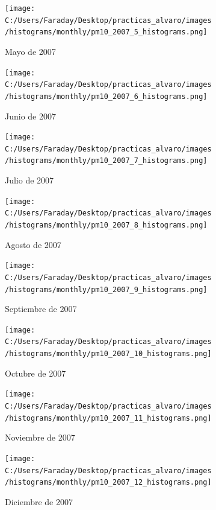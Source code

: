\documentclass[12pt]{article}
\begin{document}
\begin{figure}[H]
\centering
\begin{subfigure}[h]{0.45\textwidth}
\texttt{[image: C:/Users/Faraday/Desktop/practicas\_alvaro/images/histograms/monthly/pm10\_2007\_5\_histograms.png]}
\caption{Mayo de 2007}
\label{fig:hist-mon-3-5-2007}
\end{subfigure}
%
\begin{subfigure}[H]{0.45\textwidth}
\texttt{[image: C:/Users/Faraday/Desktop/practicas\_alvaro/images/histograms/monthly/pm10\_2007\_6\_histograms.png]}
\caption{Junio de 2007}
\label{fig:hist-mon-3-6-2007}
\end{subfigure}
\caption{}
\end{figure}

\newpage

\begin{figure}[H]
\centering
\begin{subfigure}[h]{0.45\textwidth}
\texttt{[image: C:/Users/Faraday/Desktop/practicas\_alvaro/images/histograms/monthly/pm10\_2007\_7\_histograms.png]}
\caption{Julio de 2007}
\label{fig:hist-mon-3-7-2007}
\end{subfigure}
%
\begin{subfigure}[H]{0.45\textwidth}
\texttt{[image: C:/Users/Faraday/Desktop/practicas\_alvaro/images/histograms/monthly/pm10\_2007\_8\_histograms.png]}
\caption{Agosto de 2007}
\label{fig:hist-mon-3-8-2007}
\end{subfigure}
\caption{}
\end{figure}

\begin{figure}[H]
\centering
\begin{subfigure}[h]{0.45\textwidth}
\texttt{[image: C:/Users/Faraday/Desktop/practicas\_alvaro/images/histograms/monthly/pm10\_2007\_9\_histograms.png]}
\caption{Septiembre de 2007}
\label{fig:hist-mon-3-9-2007}
\end{subfigure}
%
\begin{subfigure}[H]{0.45\textwidth}
\texttt{[image: C:/Users/Faraday/Desktop/practicas\_alvaro/images/histograms/monthly/pm10\_2007\_10\_histograms.png]}
\caption{Octubre de 2007}
\label{fig:hist-mon-3-10-2007}
\end{subfigure}
\caption{}
\end{figure}

\begin{figure}[H]
\centering
\begin{subfigure}[h]{0.45\textwidth}
\texttt{[image: C:/Users/Faraday/Desktop/practicas\_alvaro/images/histograms/monthly/pm10\_2007\_11\_histograms.png]}
\caption{Noviembre de 2007}
\label{fig:hist-mon-3-11-2007}
\end{subfigure}
%
\begin{subfigure}[H]{0.45\textwidth}
\texttt{[image: C:/Users/Faraday/Desktop/practicas\_alvaro/images/histograms/monthly/pm10\_2007\_12\_histograms.png]}
\caption{Diciembre de 2007}
\label{fig:hist-mon-3-12-2007}
\end{subfigure}
\caption{}
\end{figure}
\end{document}
